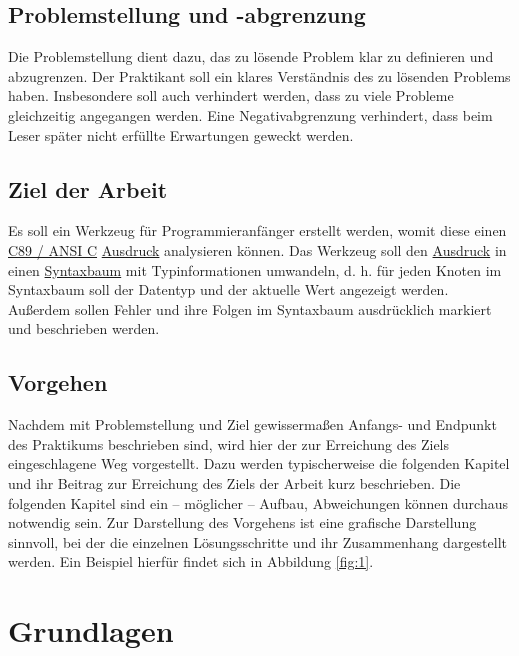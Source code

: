 \documentclass[oneside]{ausarbeitung}
\begin{document}
\section{Problemstellung und -abgrenzung}
\label{sec:problemstellung}

Die Problemstellung dient dazu, das zu lösende Problem klar zu 
definieren und abzugrenzen. Der Praktikant soll ein klares Verständnis 
des zu lösenden Problems haben. Insbesondere soll auch verhindert 
werden, dass zu viele Probleme gleichzeitig angegangen werden. Eine 
Negativabgrenzung verhindert, dass beim Leser später nicht erfüllte 
Erwartungen geweckt werden.

\section{Ziel der Arbeit}
\label{sec:ziel}

Es soll ein Werkzeug für Programmieranfänger erstellt werden, womit diese einen \hyperref[sub:c89]{C89 / ANSI C} \hyperref[sub:expression]{Ausdruck} analysieren können. Das Werkzeug soll den \hyperref[sub:expression]{Ausdruck} in einen \hyperref[sub:syntax_tree]{Syntaxbaum} mit Typinformationen umwandeln, d. h. für jeden Knoten im Syntaxbaum soll der Datentyp und der aktuelle Wert angezeigt werden. Außerdem sollen Fehler und ihre Folgen im Syntaxbaum ausdrücklich markiert und beschrieben werden.

\section{Vorgehen}
\label{sec:vorgehen}

Nachdem mit Problemstellung und Ziel gewissermaßen Anfangs- und Endpunkt 
des Praktikums beschrieben sind, wird hier der zur Erreichung des Ziels 
eingeschlagene Weg vorgestellt. Dazu werden typischerweise die folgenden 
Kapitel und ihr Beitrag zur Erreichung des Ziels der Arbeit kurz 
beschrieben. Die folgenden Kapitel sind ein – möglicher – Aufbau, 
Abweichungen können durchaus notwendig sein. Zur Darstellung des 
Vorgehens ist eine grafische Darstellung sinnvoll, bei der die einzelnen 
Lösungsschritte und ihr Zusammenhang dargestellt werden. Ein Beispiel 
hierfür findet sich in Abbildung \ref{fig:1}.


\chapter{Grundlagen}
\label{cha:grundlagen}
\end{document}
